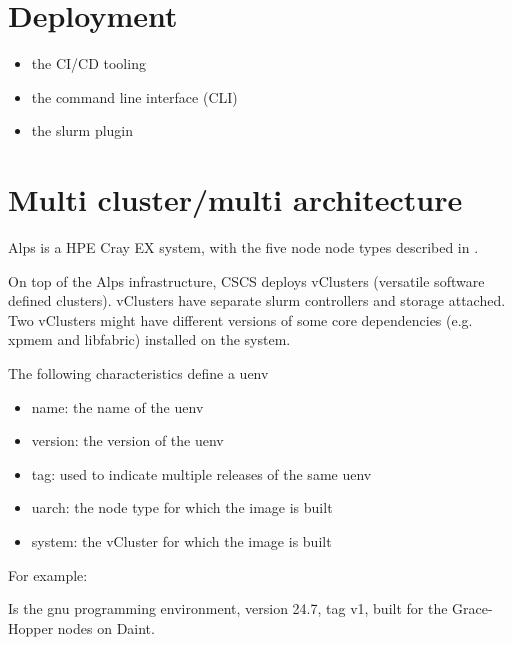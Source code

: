 \section{Deployment}
\label{sec:deployment}


\begin{itemize}
\item the CI/CD tooling
\item the command line interface (CLI)
\item the slurm plugin
\end{itemize}

\section{Multi cluster/multi architecture}

Alps is a HPE Cray EX system, with the five node node types described in .

On top of the Alps infrastructure, CSCS deploys vClusters (versatile software defined clusters).
vClusters have separate slurm controllers and storage attached.
Two vClusters might have different versions of some core dependencies (e.g. xpmem and libfabric) installed on the system.

The following characteristics define a uenv
\begin{itemize}
    \item name: the name of the uenv
    \item version: the version of the uenv
    \item tag: used to indicate multiple releases of the same uenv
    \item uarch: the node type for which the image is built
    \item system: the vCluster for which the image is built
\end{itemize}

For example: 

Is the gnu programming environment, version 24.7, tag v1, built for the Grace-Hopper nodes on Daint.

